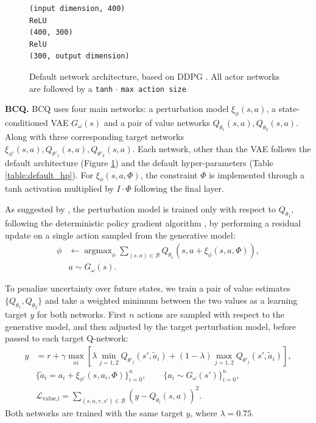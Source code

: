 \documentclass{article}
\newcommand{\y}{\gamma}
\newcommand{\ta}{\theta}
\newcommand{\w}{\omega}
\newcommand{\lb}{\left [}
\newcommand{\rb}{\right ]}
\newcommand{\B}{\mathcal{B}}
\DeclareMathOperator*{\argmax}{argmax}
\begin{document}
\begin{figure}[ht]
\centering
\begin{BVerbatim}
(input dimension, 400)
ReLU
(400, 300)
RelU
(300, output dimension)
\end{BVerbatim}
\caption{Default network architecture, based on DDPG \cite{DDPG}. All actor networks are followed by a \texttt{tanh} $\cdot$ \texttt{max action size}} \label{fig:default_arch}
\end{figure}

\textbf{BCQ.} BCQ uses four main networks: a perturbation model $\xi_\phi(s,a)$, a state-conditioned VAE $G_\w(s)$ and a pair of value networks $Q_{\ta_1}(s,a), Q_{\ta_2}(s,a)$. Along with three corresponding target networks $\xi_{\phi'}(s,a), Q_{\ta'_1}(s,a), Q_{\ta'_2}(s,a)$. Each network, other than the VAE follows the default architecture (Figure \ref{fig:default_arch}) and the default hyper-parameters (Table \ref{table:default_hp}). For $\xi_\phi(s,a, \Phi)$, the constraint $\Phi$ is implemented through a tanh activation multiplied by $I \cdot \Phi$ following the final layer. 

As suggested by \citet{fujimoto2018addressing}, the perturbation model is trained only with respect to $Q_{\ta_1}$, following the deterministic policy gradient algorithm \citep{DPG}, by performing a residual update on a single action sampled from the generative model:
\begin{equation}
\begin{split}
\phi &\leftarrow \argmax_{\phi} \sum_{(s,a) \in \B} Q_{\ta_1}(s,a + \xi_{\phi}(s, a, \Phi)), \\
&a \sim G_\w(s).
\end{split}
\end{equation}

To penalize uncertainty over future states, we train a pair of value estimates $\{ Q_{\ta_1}, Q_{\ta_2} \}$ and take a weighted minimum between the two values as a learning target $y$ for both networks. First $n$ actions are sampled with respect to the generative model, and then adjusted by the target perturbation model, before passed to each target Q-network:
\begin{equation} \label{appendix:softmin}
\begin{split}
y &= r + \y \max_{ai} \lb \lambda \min_{j=1,2} Q_{\ta'_j}(s', \tilde a_i) + (1 - \lambda) \max_{j=1,2} Q_{\ta'_j}(s', \tilde a_i) \rb, \\ 
& \{ \tilde a_i = a_i + \xi_{\phi'}(s, a_i, \Phi) \}_{i=0}^n, \qquad \{ a_i \sim G_\w(s') \}_{i=0}^n, \\
&\mathcal{L}_\text{value,i} = \sum_{(s,a,r,s') \in \B} (y - Q_{\ta_i}(s,a))^2.
\end{split}
\end{equation}
Both networks are trained with the same target $y$, where $\lambda=0.75$. 
\end{document}
